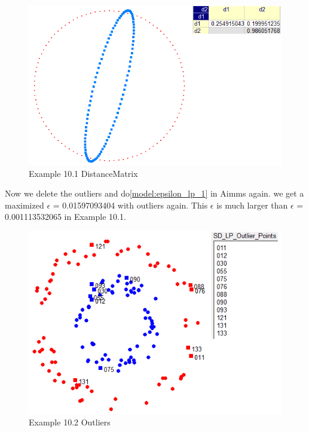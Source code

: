 \documentclass[]{article}
\begin{document}
\begin{figure}[htbp]
\begin{center}
\includegraphics[scale=0.7]{Example_10_1_DistanceMatrix_1.PNG}
\caption{Example 10.1 DistanceMatrix}
\label{fig:Example_10_1_DistanceMatrix_1}
\end{center}
\end{figure}


\newpage
Now we delete the outliers and do\eqref{model:epsilon_lp_1} in Aimms again. we get a maximized $\epsilon$ =  0.01597093404 with outliers again. This $\epsilon$ is much larger than $\epsilon$ =  0.001113532065 in Example 10.1.

\begin{figure}[htbp]
\begin{center}
\includegraphics[scale=0.7]{Example_10_2_outliers_1.PNG}
\caption{Example 10.2 Outliers}
\label{fig:Example_10_2_outliers_1}
\end{center}
\end{figure}
\end{document}
